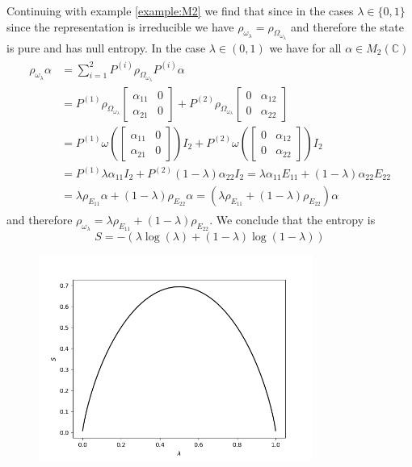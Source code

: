 \begin{example}
Continuing with example \ref{example:M2} we find that since in the cases $\lambda\in\{0,1\}$ since the representation is irreducible we have $\rho_{\omega_\lambda}=\rho_{\Omega_{\omega_\lambda}}$ and therefore the state is pure and has null entropy. In the case $\lambda\in (0,1)$ we have for all $\alpha\in M_2(\mathbb{C})$
\begin{align}
\begin{split}
\rho_{\omega_\lambda}\alpha &= \sum_{i=1}^2 P^{(i)}\rho_{\Omega_{\omega_\lambda}}P^{(i)}\alpha \\
& = P^{(1)}\rho_{\Omega_{\omega_\lambda}}\begin{bmatrix}
\alpha_{11} & 0 \\
\alpha_{21} & 0 
\end{bmatrix} + P^{(2)}\rho_{\Omega_{\omega_\lambda}}\begin{bmatrix}
0 & \alpha_{12} \\
0 & \alpha_{22} 
\end{bmatrix} \\
& = P^{(1)}\omega\left(\begin{bmatrix}
\alpha_{11} & 0 \\
\alpha_{21} & 0 
\end{bmatrix} \right)I_2 + P^{(2)}\omega\left(\begin{bmatrix}
0 & \alpha_{12} \\
0 & \alpha_{22} 
\end{bmatrix} \right)I_2 \\
&= P^{(1)}\lambda\alpha_{11}I_2 + P^{(2)}(1-\lambda)\alpha_{22}I_2 =\lambda\alpha_{11} E_{11} + (1-\lambda)\alpha_{22}E_{22} \\
& = \lambda\rho_{E_{11}}\alpha + (1-\lambda)\rho_{E_{22}}\alpha = (\lambda\rho_{E_{11}} + (1-\lambda)\rho_{E_{22}})\alpha
\end{split}
\end{align} 
and therefore $\rho_{\omega_\lambda}=\lambda\rho_{E_{11}} + (1-\lambda)\rho_{E_{22}}$.
We conclude that the entropy is 
\begin{equation}\label{eq:entropy_M2}
S = -(\lambda\log (\lambda) + (1-\lambda)\log(1-\lambda))
\end{equation}
\begin{figure}
\centering
\includegraphics[width=0.8\textwidth]{entropia_M2.png}

\end{figure}
\end{example}
